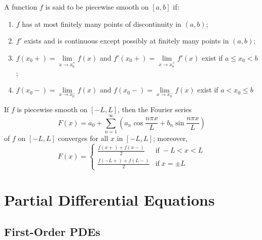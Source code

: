 \documentclass[12pt, a4paper, oneside, openright, titlepage]{book}
\begin{document}


\begin{defn}
        A function $f$ is said to be piecewise smooth on $[a,b]$ if:\begin{enumerate}
                \item $f$ has at most finitely many points of discontinuity in $(a,b)$;
                \item $f'$ exists and is continuous except possibly at finitely many points in $(a,b)$;
                \item $f(x_0+)=\lim\limits_{x\rightarrow x_0^+}f(x)$ and $f'(x_0+)=\lim\limits_{x\rightarrow x_0^+}f'(x)$ exist if $a \leq x_0 < b$;
                \item $f(x_0-)=\lim\limits_{x\rightarrow x_0^-}f(x)$ and $f(x_0-)=\lim\limits_{x\rightarrow x_0^-}f(x)$ exist if $a < x_0 \leq b$
        \end{enumerate}
\end{defn}



\begin{thm}
        If $f$ is piecewise smooth on $[-L,L]$, then the Fourier series \begin{equation}
                F(x) = a_0 + \sum\limits_{n=1}^{\infty}\left(a_n\cos\frac{n\pi x}{L}+b_n\sin\frac{n\pi x}{L}\right)
        \end{equation}
        of $f$ on $[-L,L]$ converges for all $x$ in $[-L,L]$; moreover, \begin{equation}
                F(x) = \left\{\begin{array}{cc} \frac{f(x+)+f(x-)}{2} & \text{if}\;-L < x < L \\ \frac{f(-L+)+f(L-)}{2} & \text{if}\;x=\pm L \end{array}\right.
        \end{equation}
\end{thm}





\part{Partial Differential Equations}



\chapter{First-Order PDEs}
\end{document}
